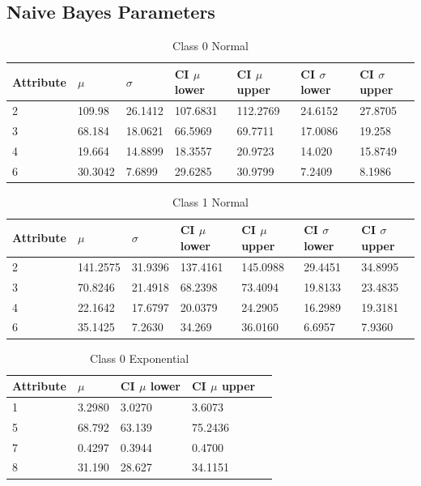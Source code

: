 \documentclass[12pt, letterpaper]{report}
\begin{document}
\subsection{Naive Bayes Parameters}

\begin{table}[H]
	\centering
	\begin{tabular}{ |l|l|l|l|l|l|l| }
		\hline
		\textbf{Attribute} & \textbf{$\mu$} & \textbf{$\sigma$} & \textbf{CI $\mu$ lower} & \textbf{CI $\mu$ upper} & \textbf{CI $\sigma$ lower} & \textbf{CI $\sigma$ upper} \\
		\hline
		2 & 109.98 & 26.1412 & 107.6831 & 112.2769 & 24.6152 & 27.8705 \\
		\hline
		3 & 68.184 & 18.0621 & 66.5969 & 69.7711 & 17.0086 & 19.258 \\
		\hline
		4 & 19.664 & 14.8899 & 18.3557 & 20.9723 & 14.020 & 15.8749 \\
		\hline
		6 & 30.3042 & 7.6899 & 29.6285 & 30.9799 & 7.2409 & 8.1986 \\
		\hline
	\end{tabular}
	\caption{Class 0 Normal}
\end{table}

\begin{table}[H]
	\centering
	\begin{tabular}{ |l|l|l|l|l|l|l| }
		\hline
		\textbf{Attribute} & \textbf{$\mu$} & \textbf{$\sigma$} & \textbf{CI $\mu$ lower} & \textbf{CI $\mu$ upper} & \textbf{CI $\sigma$ lower} & \textbf{CI $\sigma$ upper} \\
		\hline
		2 & 141.2575 & 31.9396 & 137.4161 & 145.0988 & 29.4451 & 34.8995 \\
		\hline
		3 & 70.8246 & 21.4918 & 68.2398 & 73.4094 & 19.8133 & 23.4835 \\
		\hline
		4 & 22.1642 & 17.6797 & 20.0379 & 24.2905 & 16.2989 & 19.3181 \\
		\hline
		6 & 35.1425 & 7.2630 & 34.269 & 36.0160 & 6.6957 & 7.9360 \\
		\hline
	\end{tabular}
	\caption{Class 1 Normal}
\end{table}

\begin{table}[H]
	\centering
	\begin{tabular}{ |l|l|l|l|l }
		\hline
		\textbf{Attribute} & \textbf{$\mu$} & \textbf{CI $\mu$ lower} & \textbf{CI $\mu$ upper} \\
		\hline
		1 & 3.2980 & 3.0270 & 3.6073 \\
		\hline
		5 & 68.792 & 63.139 & 75.2436 \\
		\hline
		7 & 0.4297 & 0.3944 & 0.4700 \\
		\hline
		8 & 31.190 & 28.627 & 34.1151 \\
		\hline
	\end{tabular}
	\caption{Class 0 Exponential}
\end{table}
\end{document}
